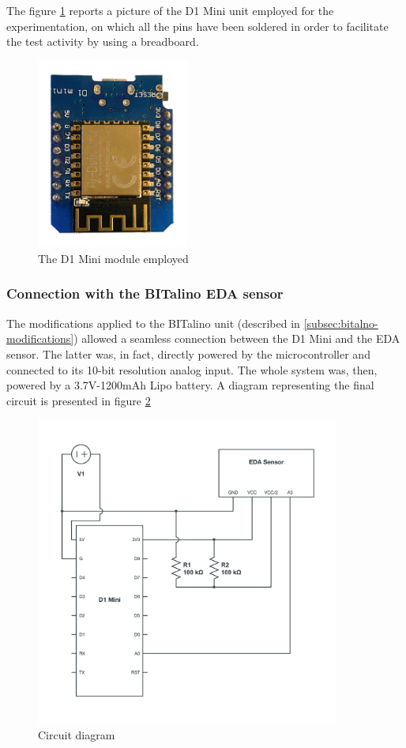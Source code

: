The figure \ref{fig:d1mini} reports a picture of the D1 Mini unit employed for the experimentation, on which all the pins have been soldered in order to facilitate the test activity by using a breadboard.

\begin{figure}[h]
    \centering
    \includegraphics[width=5cm]{./images/d1mini.png}
    \caption{The D1 Mini module employed}
    \label{fig:d1mini}
\end{figure}

\subsubsection{Connection with the BITalino EDA sensor}\label{subsubsec:d1mini}

The modifications applied to the BITalino unit (described in \ref{subsec:bitalno-modifications}) allowed a seamless connection between the D1 Mini and the EDA sensor. The latter was, in fact, directly powered by the microcontroller and connected to its 10-bit resolution analog input. The whole system was, then, powered by a 3.7V-1200mAh Lipo battery. A diagram representing the final circuit is presented in figure \ref{fig:circuit-diagram}

\begin{figure}[h]
    \centering
    \includegraphics[width=10cm]{./images/circuit-diagram.png}
    \caption{Circuit diagram}
    \label{fig:circuit-diagram}
\end{figure}

